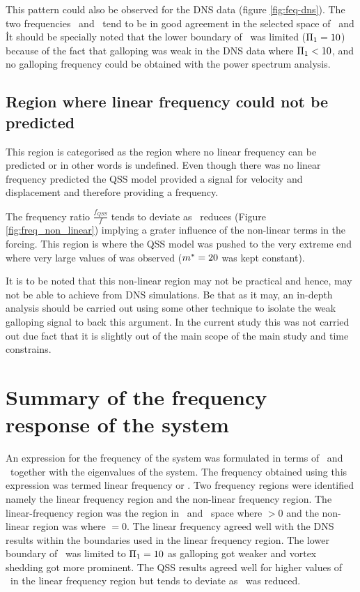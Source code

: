 
 
 This pattern could also be observed for the DNS data (figure \ref{fig:feq-dns}). The two frequencies \freqlin\ and \freqdns\ tend to be in good agreement in the selected space of \massstiff\ and \massdamp\. It should be specially noted that the lower boundary of \massstiff\ was limited ($\Pi_1=10$) because of the fact that galloping was weak in the DNS data where $\Pi_1<10$, and no galloping frequency could be obtained with the power spectrum analysis. 


\subsection{Region where linear frequency could not be predicted}

This region is categorised as the region where no linear frequency can be predicted or in other words \freqlin is undefined. Even though there was no linear frequency predicted the QSS model provided a signal for velocity and displacement and therefore providing a frequency. 



The frequency ratio $\frac{f_{QSS}}{f}$ tends to deviate as \massstiff\ reduces (Figure \ref{fig:freq_non_linear}) implying a grater influence of the non-linear terms in the forcing. This region is where the QSS model was pushed to the very extreme end where very large values of \ustar was observed ($m^{*}=20$ was kept constant). 

It is to be noted that this non-linear region may not be practical and hence, may not be able to achieve from DNS simulations. Be that as it may, an in-depth analysis should be carried out using some other technique to isolate the weak galloping signal to back this argument. In the current study this was not carried out due fact that it is slightly out of the main scope of the main study and time constrains. 

\section{Summary of the frequency response of the system}

An expression for the frequency of the system was formulated in terms of \massstiff\ and \massdamp\ together with the eigenvalues of the system. The frequency obtained using this expression was termed linear frequency or \freqlin. Two frequency regions were identified namely the linear frequency region and the non-linear frequency region. The linear-frequency region was the region in \massstiff\ and \massdamp\ space where \freqlin$>0$ and the non-linear region was where \freqlin$=0$. The linear frequency agreed well with the DNS results within the boundaries used in the linear frequency region. The lower boundary of \massstiff\ was limited to $\Pi_1=10$ as galloping got weaker and vortex shedding got more prominent. The QSS results agreed well for higher values of \massstiff\ in the linear frequency region but tends to deviate as \massstiff\ was reduced. 

